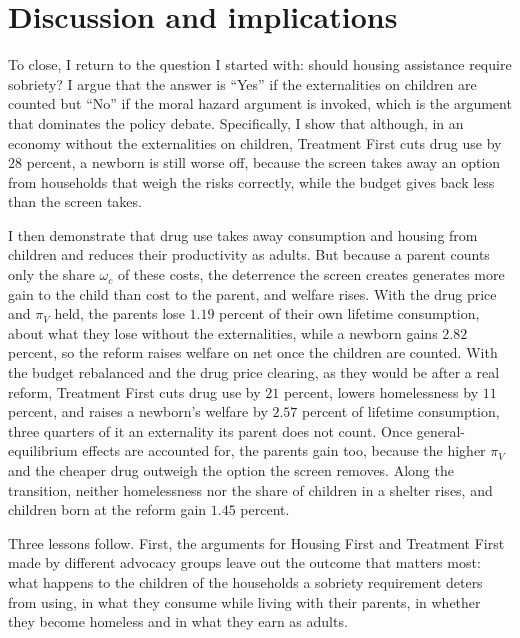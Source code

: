 \documentclass[10pt]{article}
\newif\ifshowupdates \showupdatesfalse
\newcommand{\updnum}[1]{\ifshowupdates{\color{blue}#1}\else#1\fi}
\begin{document}
\section{Discussion and implications}\label{sec:discussion}

To close, I return to the question I started with: should housing assistance require sobriety?   I argue that the answer is  ``Yes'' if the externalities on children are counted but ``No'' if the moral hazard argument is invoked, which is the argument that dominates the policy debate.   Specifically, I show that although, in an economy without the externalities on children, Treatment First cuts drug use by $28$ percent, a newborn is still worse off, because the screen takes away an option from households that weigh the risks correctly, while the budget gives back less than the screen takes.

 I  then demonstrate that drug use takes away consumption and housing from children and reduces their productivity as adults.  But because a parent counts only the share $\omega_c$ of these costs, the deterrence the screen creates generates more gain to the child than cost to the parent, and welfare rises. With the drug price and $\pi_V$ held, the parents lose $1.19$ percent of their own lifetime consumption, about what they lose without the externalities, while a newborn gains $2.82$ percent, so the reform raises welfare on net once the children are counted. With the budget rebalanced and the drug price clearing, as they would be after a real reform, Treatment First cuts drug use by $21$ percent, lowers homelessness by $11$ percent, and raises a newborn's welfare by $2.57$ percent of lifetime consumption, three quarters of it an externality its parent does not count. Once general-equilibrium effects are accounted for, the parents gain too, because the higher $\pi_V$ and the cheaper drug outweigh the option the screen removes. Along the transition, neither homelessness nor the share of children in a shelter rises, and children born at the reform gain \updnum{$1.45$} percent.

Three lessons follow. First, the arguments for Housing First and Treatment First made by different advocacy
groups leave out the outcome that matters most: what happens to the children of the households a sobriety requirement deters from using, in what they consume while living with their parents, in whether they become homeless and in what they earn as adults.
\end{document}
